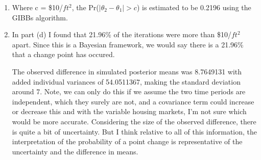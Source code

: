 \documentclass{article}\usepackage[]{graphicx}\usepackage[]{color}
\newenvironment{knitrout}{}{} %
\begin{document}
\begin{enumerate}
\begin{enumerate}
\begin{knitrout}
{}



\end{knitrout}

\item%


Where c = \$10/$ft^{2}$, the Pr($|\theta_{2} - \theta_{1}| > c$) is estimated to be 0.2196 using the GIBBs algorithm.

\item %
In part (d) I found that 21.96\% of the iterations were more than \$10/$ft^{2}$ apart. Since this is a Bayesian framework, we would say there is a 21.96\% that a change point has occured. 

The observed difference in simulated posterior means was 8.7649131 with added individual variances of 54.0511367, making the standard deviation around 7. Note, we can only do this if we assume the two time periods are independent, which they surely are not, and a covariance term could increase or decrease this and with the variable housing markets, I'm not sure which would be more accurate. Considering the size of the observed difference, there is quite a bit of uncertainty. But I think relative to all of this information, the interpretation of the probability of a point change is representative of the uncertainty and the difference in means.
\end{enumerate}
\end{enumerate}

\appendix
\end{document}
